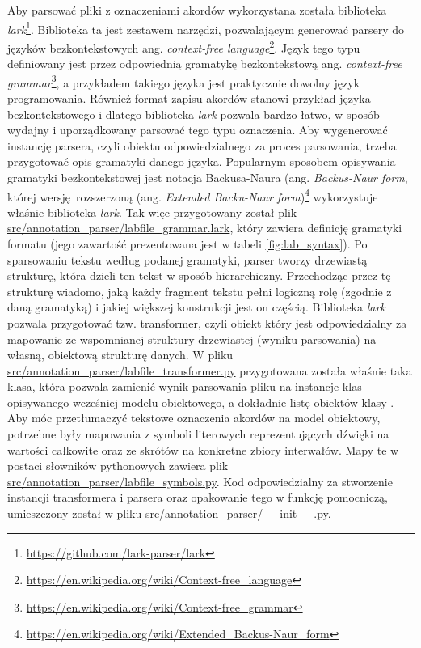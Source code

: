 Aby parsować pliki z oznaczeniami akordów wykorzystana została biblioteka \emph{lark}\footnote{\url{https://github.com/lark-parser/lark}}. Biblioteka ta jest zestawem narzędzi, pozwalającym generować parsery do języków bezkontekstowych ang. \emph{context-free language}\footnote{\url{https://en.wikipedia.org/wiki/Context-free_language}}. Język tego typu definiowany jest przez odpowiednią gramatykę bezkontekstową ang. \emph{context-free grammar}\footnote{\url{https://en.wikipedia.org/wiki/Context-free_grammar}}, a przykładem takiego języka jest praktycznie dowolny język programowania. Również format zapisu akordów stanowi przykład języka bezkontekstowego i dlatego biblioteka \emph{lark} pozwala bardzo łatwo, w sposób wydajny i uporządkowany parsować tego typu oznaczenia. Aby wygenerować instancję parsera, czyli obiektu odpowiedzialnego za proces parsowania, trzeba przygotować opis gramatyki danego języka. Popularnym sposobem opisywania gramatyki bezkontekstowej jest notacja Backusa-Naura (ang. \emph{Backus-Naur form}, której wersję rozszerzoną (ang. \emph{Extended Backu-Naur form})\footnote{\url{https://en.wikipedia.org/wiki/Extended_Backus-Naur_form}} wykorzystuje właśnie biblioteka \emph{lark}. Tak więc przygotowany został plik \url{src/annotation_parser/labfile_grammar.lark}, który zawiera definicję gramatyki formatu  (jego zawartość prezentowana jest w tabeli \ref{fig:lab_syntax}). Po sparsowaniu tekstu według podanej gramatyki, parser tworzy drzewiastą strukturę, która dzieli ten tekst w sposób hierarchiczny. Przechodząc przez tę strukturę wiadomo, jaką każdy fragment tekstu pełni logiczną rolę (zgodnie z daną gramatyką) i jakiej większej konstrukcji jest on częścią. Biblioteka \emph{lark} pozwala przygotować tzw. transformer, czyli obiekt który jest odpowiedzialny za mapowanie ze wspomnianej struktury drzewiastej (wyniku parsowania) na własną, obiektową strukturę danych. W pliku \url{src/annotation_parser/labfile_transformer.py} przygotowana została właśnie taka klasa, która pozwala zamienić wynik parsowania pliku  na instancje klas opisywanego wcześniej modelu obiektowego, a dokładnie listę obiektów klasy . Aby móc przetłumaczyć tekstowe oznaczenia akordów na model obiektowy, potrzebne były mapowania z symboli literowych reprezentujących dźwięki na wartości całkowite oraz ze skrótów na konkretne zbiory interwałów. Mapy te w postaci słowników pythonowych zawiera plik \url{src/annotation_parser/labfile_symbols.py}. Kod odpowiedzialny za stworzenie instancji transformera i parsera oraz opakowanie tego w funkcję pomocniczą, umieszczony został w pliku \url{src/annotation_parser/__init__.py}. 

